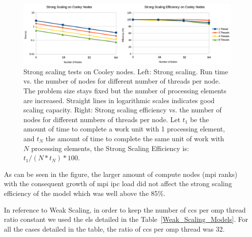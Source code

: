 \documentclass[11pt,a4paper]{article}
\begin{document}
\begin{figure}[h!]
    \centering
    \includegraphics[width=1.0\textwidth]{Strong_Scaling1.png}
    \caption{Strong scaling tests on Cooley nodes. Left: Strong scaling. Run time vs. the number of nodes for different number of threads per node. The problem size stays fixed but the number of processing elements are increased. Straight lines in logarithmic scales indicates good scaling capacity. Right: Strong scaling efficiency vs. the number of nodes for different numbers of threads per node. Let $t_1$ be the amount of time to complete a work unit with 1 processing element, and $t_N$ the amount of time to complete the same unit of work with $N$ processing elements, the Strong Scaling Efficiency is: $t_1 / (N * t_N) * 100$.}
    \label{fig:Strong_Scaling1}
\end{figure}

As can be seen in the figure, the larger amount of compute nodes (\gls{mpi} ranks) with the consequent growth of \gls{mpi} \gls{ipc} load did not affect the strong scaling efficiency of the model which was well above the 85\%.

In reference to Weak Scaling, in order to keep the number of \glspl{cc} per \gls{omp} thread ratio constant we used the \glspl{el} detailed in the Table~\ref{Weak_Scaling_Models}. For all the cases detailed in the table, the ratio of \glspl{cc} per \gls{omp} thread was 32.
\end{document}
